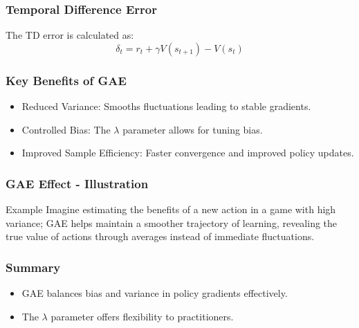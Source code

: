 \documentclass[aspectratio=169]{beamer}
\begin{document}
\begin{frame}[fragile]
    \frametitle{Temporal Difference Error}
    The TD error is calculated as:
    \begin{equation}
    \delta_t = r_t + \gamma V(s_{t+1}) - V(s_t)
    \end{equation}
\end{frame}

\begin{frame}[fragile]
    \frametitle{Key Benefits of GAE}
    \begin{itemize}
        \item Reduced Variance: Smooths fluctuations leading to stable gradients.
        \item Controlled Bias: The \(\lambda\) parameter allows for tuning bias.
        \item Improved Sample Efficiency: Faster convergence and improved policy updates.
    \end{itemize}
\end{frame}

\begin{frame}[fragile]
    \frametitle{GAE Effect - Illustration}
    \begin{block}{Example}
        Imagine estimating the benefits of a new action in a game with high variance; GAE helps maintain a smoother trajectory of learning, revealing the true value of actions through averages instead of immediate fluctuations.
    \end{block}
\end{frame}

\begin{frame}[fragile]
    \frametitle{Summary}
    \begin{itemize}
        \item GAE balances bias and variance in policy gradients effectively.
        \item The \(\lambda\) parameter offers flexibility to practitioners.
    \end{itemize}
\end{frame}
\end{document}

